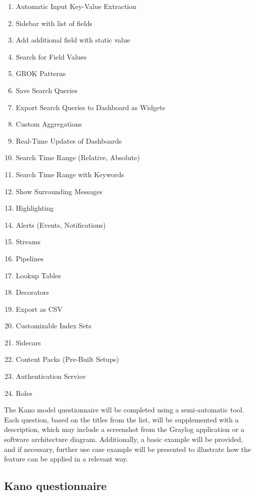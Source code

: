 \documentclass[../main.tex]{subfiles}
\begin{document}
\begin{enumerate}
    \item Automatic Input Key-Value Extraction
    \item Sidebar with list of fields
    \item Add additional field with static value
    \item Search for Field Values
    \item GROK Patterns
    \item Save Search Queries
    \item Export Search Queries to Dashboard as Widgets
    \item Custom Aggregations
    \item Real-Time Updates of Dashboards
    \item Search Time Range (Relative, Absolute)
    \item Search Time Range with Keywords
    \item Show Surrounding Messages
    \item Highlighting
    \item Alerts (Events, Notifications)
    \item Streams
    \item Pipelines
    \item Lookup Tables
    \item Decorators
    \item Export as CSV
    \item Customizable Index Sets
    \item Sidecars
    \item Content Packs (Pre-Built Setups)
    \item Authentication Service
    \item Roles
\end{enumerate}

The Kano model questionnaire will be completed using a semi-automatic tool. Each question, based on the titles from the list, will be supplemented with a description, which may include a screenshot from the Graylog application or a software architecture diagram. Additionally, a basic example will be provided, and if necessary, further use case example will be presented to illustrate how the feature can be applied in a relevant way.

\subsection{Kano questionnaire}
\end{document}
